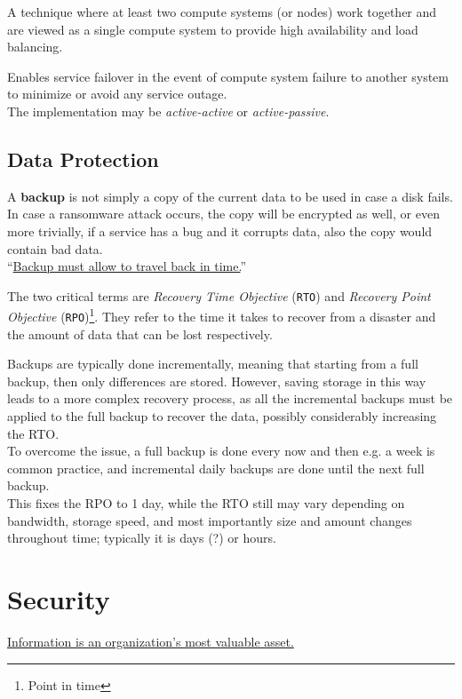 \begin{definition}
   A technique where at least two compute systems (or nodes) work together and are viewed as a single compute system to provide high availability and load balancing. 

\end{definition}
Enables service failover in the event of compute system failure to another system to minimize or avoid any service outage.\\
The implementation may be \textit{active-active} or \textit{active-passive}.

\subsection{Data Protection}
A \textbf{backup} is not simply a copy of the current data to be used in case a disk fails. In case a ransomware attack occurs, the copy will be encrypted as well, or even more trivially, if a service has a bug and it corrupts data, also the copy would contain bad data.\\
``\ul{Backup must allow to travel back in time.}''

The two critical terms are \textit{Recovery Time Objective} (\texttt{RTO}) and  \textit{Recovery Point Objective} (\texttt{RPO})\footnote{Point in time}.
They refer to the time it takes to recover from a disaster and the amount of data that can be lost respectively.

Backups are typically done incrementally, meaning that starting from a full backup, then only differences are stored.
However, saving storage in this way leads to a more complex recovery process, as all the incremental backups must be applied to the full backup to recover the data, possibly considerably increasing the RTO.\\
To overcome the issue, a full backup is done every now and then e.g. a week is common practice, and incremental daily backups are done until the next full backup.\\
This fixes the RPO to 1 day, while the RTO still may vary depending on bandwidth, storage speed, and most importantly size and amount changes throughout time; typically it is days (?) or hours.

\section{Security}
\ul{Information is an organization’s most valuable asset.}

